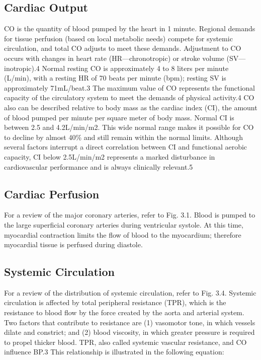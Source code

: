 \subsection{Cardiac Output}
CO is the quantity of blood pumped by the heart in 1 minute. Regional demands for tissue perfusion (based on local metabolic needs) compete for systemic circulation, and total CO adjusts to meet these demands. Adjustment to CO occurs with changes in heart rate (HR—chronotropic) or stroke volume (SV—inotropic).4 Normal resting CO is approximately 4 to 8 liters per minute (L/min), with a resting HR of 70 beats per minute (bpm); resting SV is approximately 71mL/beat.3 The maximum value of CO represents the functional capacity of the circulatory system to meet the demands of physical activity.4
CO also can be described relative to body mass as the cardiac index (CI), the amount of blood pumped per minute per square meter of body mass. Normal CI is between 2.5 and 4.2L/min/m2. This wide normal range makes it possible for CO to decline by almost 40\% and still remain within the normal limits. Although several factors interrupt a direct correlation between CI and functional aerobic capacity,  CI below 2.5L/min/m2 represents a marked disturbance in cardiovascular performance and is always clinically relevant.5

\subsection{Cardiac Perfusion}

For a review of the major coronary arteries, refer to Fig. 3.1. Blood is pumped to the large superficial coronary arteries during ventricular systole. At this time, myocardial contraction limits the flow of blood to the myocardium; therefore myocardial tissue is perfused during diastole.

\subsection{Systemic Circulation}
For a review of the distribution of systemic circulation, refer to Fig. 3.4. Systemic circulation is affected by total peripheral resistance (TPR), which is the resistance to blood flow by the force created by the aorta and arterial system. Two factors that contribute to resistance are (1) vasomotor tone, in which vessels dilate and constrict; and (2) blood viscosity, in which greater pressure is required to propel thicker blood. TPR, also called systemic vascular resistance, and CO influence BP.3 This relationship is illustrated in the following equation:
